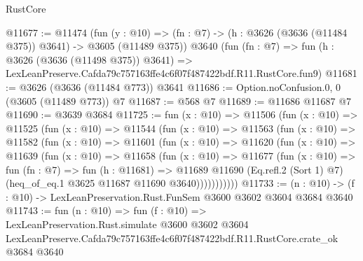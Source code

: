 \begin{lexlean}{RustCore}
\begin{coremodule}
@11677 := @11474
    (fun (y : @10) => (fn : @7) -> (h : @3626 (@3636 (@11484 @375)) @3641) -> @3605 (@11489 @375))
    @3640
    (fun (fn : @7) =>
    fun (h : @3626 (@3636 (@11498 @375)) @3641) =>
    LexLeanPreserve.Cafda79c757163ffe4c6f07f487422bdf.R11.RustCore.fun9)
@11681 := @3626 (@3636 (@11484 @773)) @3641
@11686 := Option.noConfusion.{0, 0} (@3605 (@11489 @773)) @7
@11687 := @568 @7
@11689 := @11686 @11687 @7
@11690 := @3639 @3684
@11725 := fun (x : @10) =>
  @11506
    (fun (x : @10) =>
    @11525
      (fun (x : @10) =>
      @11544
        (fun (x : @10) =>
        @11563
          (fun (x : @10) =>
          @11582
            (fun (x : @10) =>
            @11601
              (fun (x : @10) =>
              @11620
                (fun (x : @10) =>
                @11639
                  (fun (x : @10) =>
                  @11658
                    (fun (x : @10) =>
                    @11677
                      (fun (x : @10) =>
                      fun (fn : @7) =>
                      fun (h : @11681) =>
                      @11689
                        @11690
                        (Eq.refl.{2} (Sort 1) @7)
                        (heq_of_eq.{1} @3625 @11687 @11690 @3640)))))))))))
@11733 := (n : @10) -> (f : @10) -> LexLeanPreservation.Rust.FunSem @3600 @3602 @3604 @3684 @3640
@11743 := fun (n : @10) =>
  fun (f : @10) =>
  LexLeanPreservation.Rust.simulate
    @3600
    @3602
    @3604
    LexLeanPreserve.Cafda79c757163ffe4c6f07f487422bdf.R11.RustCore.crate_ok
    @3684
    @3640
\end{coremodule}
\end{lexlean}
